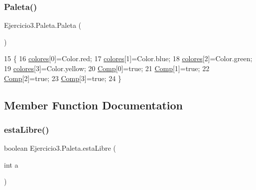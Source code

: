 \subsubsection{\texorpdfstring{Paleta()}{Paleta()}}
{\footnotesize\ttfamily Ejercicio3.\+Paleta.\+Paleta (\begin{DoxyParamCaption}{ }\end{DoxyParamCaption})\hspace{0.3cm}{\ttfamily [inline]}}


\begin{DoxyCode}
15     \{
16         \mbox{\hyperlink{class_ejercicio3_1_1_paleta_ad197acb4f704b18fcf00ad02ad45b47d}{colores}}[0]=Color.red;
17         \mbox{\hyperlink{class_ejercicio3_1_1_paleta_ad197acb4f704b18fcf00ad02ad45b47d}{colores}}[1]=Color.blue;
18         \mbox{\hyperlink{class_ejercicio3_1_1_paleta_ad197acb4f704b18fcf00ad02ad45b47d}{colores}}[2]=Color.green;
19         \mbox{\hyperlink{class_ejercicio3_1_1_paleta_ad197acb4f704b18fcf00ad02ad45b47d}{colores}}[3]=Color.yellow;
20         \mbox{\hyperlink{class_ejercicio3_1_1_paleta_a1e0d32a96f88fc79dcca5cf1f5758f6b}{Comp}}[0]=\textcolor{keyword}{true};
21         \mbox{\hyperlink{class_ejercicio3_1_1_paleta_a1e0d32a96f88fc79dcca5cf1f5758f6b}{Comp}}[1]=\textcolor{keyword}{true};
22         \mbox{\hyperlink{class_ejercicio3_1_1_paleta_a1e0d32a96f88fc79dcca5cf1f5758f6b}{Comp}}[2]=\textcolor{keyword}{true};
23         \mbox{\hyperlink{class_ejercicio3_1_1_paleta_a1e0d32a96f88fc79dcca5cf1f5758f6b}{Comp}}[3]=\textcolor{keyword}{true};
24     \}
\end{DoxyCode}


\subsection{Member Function Documentation}
\mbox{\label{class_ejercicio3_1_1_paleta_a4d66d1d99e8559d15abe32808bd51f00}} 
\subsubsection{\texorpdfstring{esta\+Libre()}{estaLibre()}}
{\footnotesize\ttfamily boolean Ejercicio3.\+Paleta.\+esta\+Libre (\begin{DoxyParamCaption}\item[{int}]{a }\end{DoxyParamCaption})\hspace{0.3cm}{\ttfamily [inline]}}


